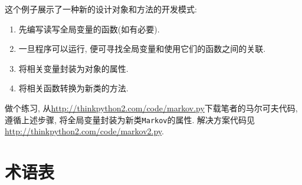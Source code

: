 \documentclass[10pt]{book}
\begin{document}
这个例子展示了一种新的设计对象和方法的开发模式:

\begin{enumerate}

\item 先编写读写全局变量的函数(如有必要).

\item 一旦程序可以运行, 便可寻找全局变量和使用它们的函数之间的关联.

\item 将相关变量封装为对象的属性.

\item 将相关函数转换为新类的方法.

\end{enumerate}

做个练习, 从\url{http://thinkpython2.com/code/markov.py}下载笔者的马尔可夫代码, 
遵循上述步骤, 将全局变量封装为新类{\tt Markov}的属性. 
解决方案代码见\url{http://thinkpython2.com/code/markov2.py}.



\section{术语表}
\end{document}
